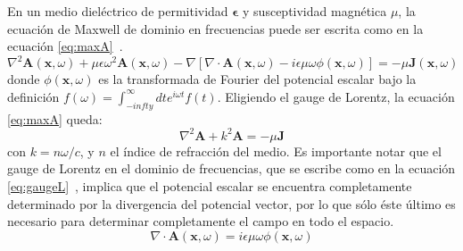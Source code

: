 En un medio diel\'ectrico de permitividad $\mathbf{\epsilon}$ y susceptividad magn\'etica $\mu$, la ecuaci\'on de Maxwell de dominio en frecuencias puede ser escrita como en la ecuaci\'on \ref{eq:maxA}~\cite{jackson:1998}.
%
\begin{equation}
\nabla^2\mathbf{A}(\mathbf{x},\omega)+\mu\epsilon\omega^2\mathbf{A}(\mathbf{x},\omega)
-\nabla\left[
\nabla\cdot\mathbf{A}(\mathbf{x},\omega)-i\epsilon\mu\omega\phi(\mathbf{x},\omega)
\right]
=
-\mu\mathbf{J}(\mathbf{x},\omega)
\label{eq:maxA}
\end{equation}
%
donde $\phi(\mathbf{x},\omega)$ es la transformada de Fourier del potencial escalar bajo la definici\'on $f(\omega)=\int_{-infty}^\infty dt e^{i\omega t} f(t)$.
Eligiendo el gauge de Lorentz, la ecuaci\'on \ref{eq:maxA} queda:
%
\begin{equation}
\nabla^2\mathbf{A}+k^2\mathbf{A}
=
-\mu\mathbf{J}
\label{eq:maxA2}
\end{equation}
%
con $k=n\omega/c$, y $n$ el \'indice de refracci\'on del medio.
Es importante notar que el gauge de Lorentz en el dominio de frecuencias, que se escribe como en la ecuaci\'on \ref{eq:gaugeL}~\cite{jackson:1998}, implica que el potencial escalar se encuentra completamente determinado por la divergencia del potencial vector, por lo que s\'olo \'este \'ultimo es necesario para determinar completamente el campo en todo el espacio.
%
\begin{equation}
\nabla\cdot\mathbf{A}(\mathbf{x},\omega)=i\epsilon\mu\omega\phi(\mathbf{x},\omega)
\label{eq:gaugeL}
\end{equation}
%

